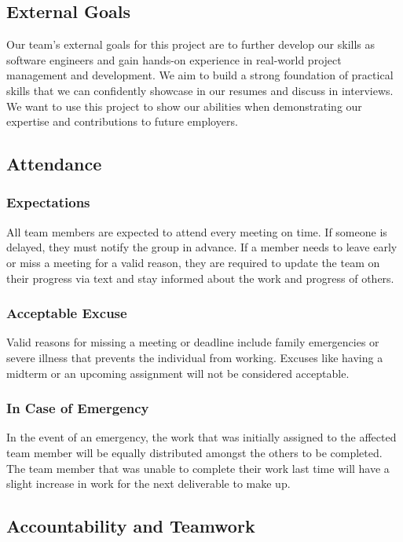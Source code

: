 \documentclass{article}
\begin{document}
\subsection*{External Goals}
Our team’s external goals for this project are to further develop our skills as software engineers and gain hands-on experience in real-world project management and development. We aim to build a strong foundation of practical skills that we can confidently showcase in our resumes and discuss in interviews. We want to use this project to show our abilities when demonstrating our expertise and contributions to future employers.

\subsection*{Attendance}

\subsubsection*{Expectations}
All team members are expected to attend every meeting on time. If someone is delayed, they must notify the group in advance. If a member needs to leave early or miss a meeting for a valid reason, they are required to update the team on their progress via text and stay informed about the work and progress of others.

\subsubsection*{Acceptable Excuse}
Valid reasons for missing a meeting or deadline include family emergencies or severe illness that prevents the individual from working. Excuses like having a midterm or an upcoming assignment will not be considered acceptable.

\subsubsection*{In Case of Emergency}
In the event of an emergency, the work that was initially assigned to the affected team member will be equally distributed amongst the others to be completed. The team member that was unable to complete their work last time will have a slight increase in work for the next deliverable to make up.


\subsection*{Accountability and Teamwork}
\end{document}
